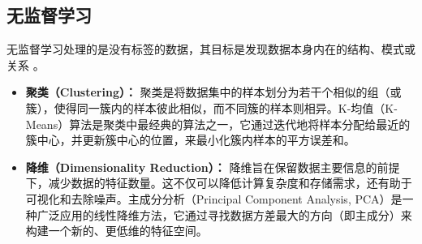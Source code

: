 \subsection{无监督学习}
\label{ssec:unsupervised_learning}
无监督学习处理的是没有标签的数据，其目标是发现数据本身内在的结构、模式或关系 \cite{neuer2024unsupervised}。
\begin{itemize}
    \item \textbf{聚类（Clustering）：} 聚类是将数据集中的样本划分为若干个相似的组（或簇），使得同一簇内的样本彼此相似，而不同簇的样本则相异。K-均值（K-Means）算法是聚类中最经典的算法之一，它通过迭代地将样本分配给最近的簇中心，并更新簇中心的位置，来最小化簇内样本的平方误差和。
    \item \textbf{降维（Dimensionality Reduction）：} 降维旨在保留数据主要信息的前提下，减少数据的特征数量。这不仅可以降低计算复杂度和存储需求，还有助于可视化和去除噪声。主成分分析（Principal Component Analysis, PCA）是一种广泛应用的线性降维方法，它通过寻找数据方差最大的方向（即主成分）来构建一个新的、更低维的特征空间。
\end{itemize}

